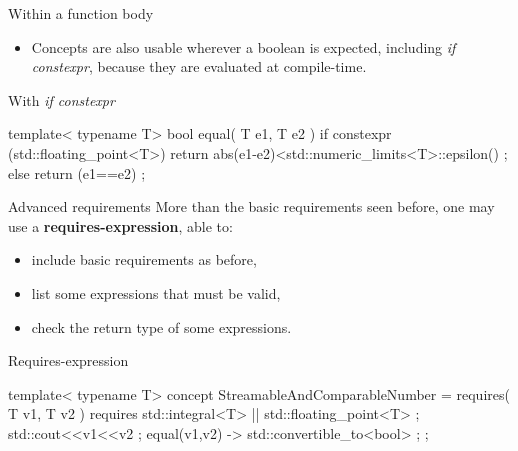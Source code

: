 \begin{frame}[fragile]
    \begin{block}{Within a function body}
      \begin{itemize}
        \item Concepts are also usable wherever a boolean is expected, including {\it if constexpr}, because they are evaluated at compile-time.
      \end{itemize}
    \end{block}
    \begin{exampleblock}{With {\it if constexpr}}
      \scriptsize
      \begin{cppcode*}{}
      template< typename T>
      bool equal( T e1, T e2 )
      {
        if constexpr (std::floating_point<T>)
        { return abs(e1-e2)<std::numeric_limits<T>::epsilon() ; }
        else
        { return (e1==e2) ; }
      }
      \end{cppcode*}
    \end{exampleblock}
\end{frame}

\begin{frame}[fragile]
    \begin{block}{Advanced requirements}
        More than the basic requirements seen before, one may use a \textbf{requires-expression}, able to:
        \begin{itemize}
            \item include basic requirements as before,
            \item list some expressions that must be valid,
            \item check the return type of some expressions.
        \end{itemize}
    \end{block}
    \begin{exampleblock}{Requires-expression}
      \scriptsize
      \begin{cppcode*}{}
      template< typename T>
      concept StreamableAndComparableNumber = requires( T v1, T v2 )
       {
        requires std::integral<T> || std::floating_point<T> ;
        std::cout<<v1<<v2 ;
        { equal(v1,v2) } -> std::convertible_to<bool> ;
       } ;
      \end{cppcode*}
    \end{exampleblock}
\end{frame}

